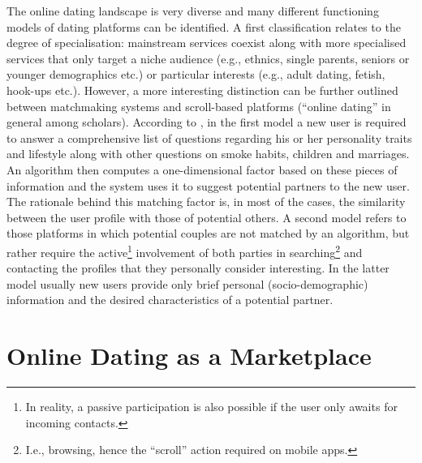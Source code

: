 The online dating landscape is very diverse and many different functioning
models of dating platforms can be identified. A first classification
relates to the degree of specialisation: mainstream services coexist
along with more specialised services that only target a niche audience
(e.g., ethnics, single parents, seniors or younger demographics etc.)
or particular interests (e.g., adult dating, fetish, hook-ups etc.).
However, a more interesting distinction can be further outlined between
matchmaking systems and scroll-based platforms (\textquotedblleft online
dating\textquotedblright{} in general among scholars). According to
\citet{Schmitz2014The-Online-Dati}, in the first model a new user
is required to answer a comprehensive list of questions regarding
his or her personality traits and lifestyle \textendash{} along with
other questions on smoke habits, children and marriages. An algorithm
then computes a one-dimensional factor based on these pieces of information
and the system uses it to suggest potential partners to the new user.
The rationale behind this matching factor is, in most of the cases,
the similarity between the user profile with those of potential others.
A second model refers to those platforms in which potential couples
are not matched by an algorithm, but rather require the active\footnote{In reality, a passive participation is also possible if the user only
awaits for incoming contacts. } involvement of both parties in searching\footnote{I.e., browsing, hence the \textquotedblleft scroll\textquotedblright{}
action required on mobile apps.} and contacting the profiles that they personally consider interesting.
In the latter model usually new users provide only brief personal
(socio-demographic) information and the desired characteristics of
a potential partner.

\section{Online Dating as a Marketplace\label{sec:Online-Dating-as}}

